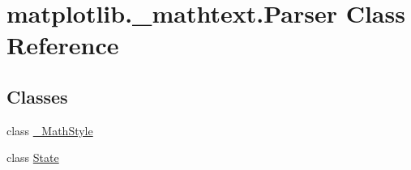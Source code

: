 \hypertarget{classmatplotlib_1_1__mathtext_1_1Parser}{}\section{matplotlib.\+\_\+mathtext.\+Parser Class Reference}
\label{classmatplotlib_1_1__mathtext_1_1Parser}
\subsection*{Classes}
\begin{DoxyCompactItemize}
\item 
class \hyperlink{classmatplotlib_1_1__mathtext_1_1Parser_1_1__MathStyle}{\+\_\+\+Math\+Style}
\item 
class \hyperlink{classmatplotlib_1_1__mathtext_1_1Parser_1_1State}{State}
\end{DoxyCompactItemize}
